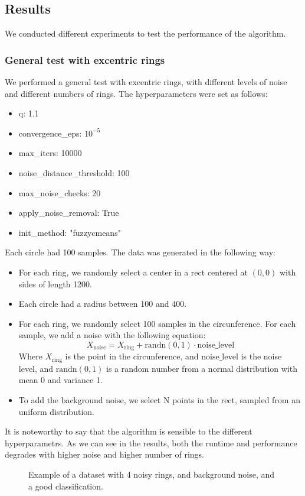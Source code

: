 \documentclass[conference]{IEEEtran}
\begin{document}
\subsection{Results}
We conducted different experiments to test the performance of the algorithm.
\subsubsection{General test with excentric rings}
We performed a general test with excentric rings, with different levels of noise and different numbers of rings.
The hyperparameters were set as follows:

\begin{itemize}
    \item q: 1.1
    \item convergence\_eps: $10^{-5}$
    \item max\_iters: 10000
    \item noise\_distance\_threshold: 100
    \item max\_noise\_checks: 20
    \item apply\_noise\_removal: True
    \item init\_method: "fuzzycmeans"
\end{itemize}

Each circle had 100 samples.
The data was generated in the following way:
\begin{itemize}
    \item For each ring, we randomly select a center in a rect centered at $(0, 0)$ with sides of length 1200.
    \item Each circle had a radius between 100 and 400.
    \item For each ring, we randomly select 100 samples in the circunference. For each sample, we add a noise with the following equation:
    \begin{equation}
        X_{\text{noise}} = X_{\text{ring}} + \text{randn}(0, 1) \cdot \text{noise\_level}
    \end{equation}
    Where $X_{\text{ring}}$ is the point in the circunference, and $\text{noise\_level}$ is the noise level, and $\text{randn}(0, 1)$ is a random number from a normal distribution with mean 0 and variance 1.
    \item To add the background noise, we select N points in the rect, sampled from an uniform distribution.
\end{itemize}

It is noteworthy to say that the algorithm is sensible to the different hyperparametrs.
As we can see in the results, both the runtime and performance degrades with higher noise and higher number of rings.
\begin{figure}[H]
    \centering
    \resizebox{0.9\linewidth}{!}{}
    \label{fig:excentric_rings}
    \caption{Example of a dataset with 4 noisy rings, and background noise, and a good classification.}
\end{figure}
\end{document}
